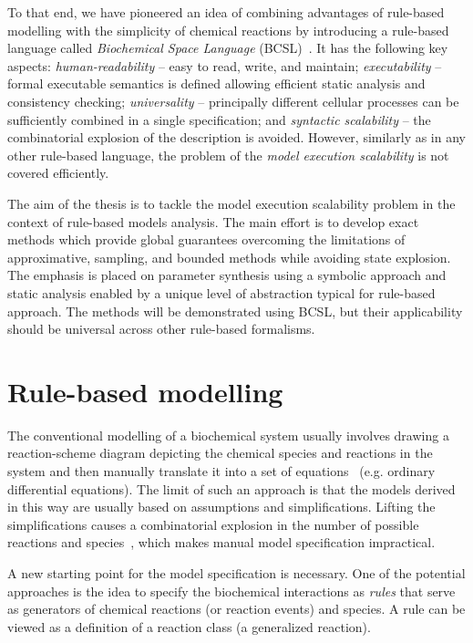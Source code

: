 \documentclass[11pt,a4paper]{report}
\begin{document}
To that end, we have pioneered an idea of combining advantages of rule-based modelling with the simplicity of chemical reactions by introducing a rule-based language called \emph{Biochemical Space Language} (BCSL)~\cite{dved2016formal}. It has the following key aspects: \emph{human-readability} -- easy to read, write, and maintain;
\emph{executability} -- formal executable semantics is defined allowing efficient static analysis and consistency checking; \emph{universality} -- principally different cellular processes can be sufficiently combined in a single specification; and \emph{syntactic scalability} -- the combinatorial explosion of the description is avoided. However, similarly as in any other rule-based language, the problem of the \emph{model execution scalability} is not covered efficiently.

The aim of the thesis is to tackle the model execution scalability problem in the context of rule-based models analysis. The main effort is to develop exact methods which provide global guarantees overcoming the limitations of approximative, sampling, and bounded methods while avoiding state explosion. The emphasis is placed on parameter synthesis using a symbolic approach and static analysis enabled by a unique level of abstraction typical for rule-based approach. The methods will be demonstrated using BCSL, but their applicability should be universal across other rule-based formalisms.

\chapter{Rule-based modelling}
\label{formal}

The conventional modelling of a biochemical system usually involves drawing a reaction-scheme diagram depicting the chemical species and reactions in the system and then manually translate it into a set of equations~\cite{voit2000computational} (e.g. ordinary differential equations). The limit of such an approach is that the models derived in this way are usually based on assumptions and simplifications. Lifting the simplifications causes a combinatorial explosion in the number of possible reactions and species~\cite{blinov2006network}, which makes manual model specification impractical.

A new starting point for the model specification is necessary. One of the potential approaches is the idea to specify the biochemical interactions as \emph{rules} that serve as generators of chemical reactions (or reaction events) and species. A rule can be viewed as a definition of a reaction class (a generalized reaction).
\end{document}
